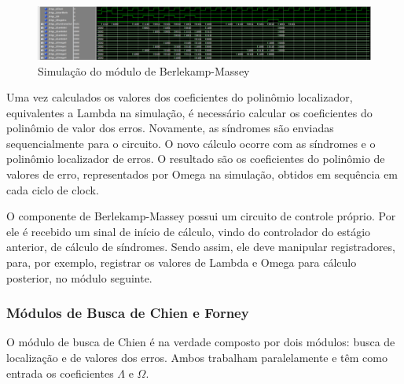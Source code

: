 	\begin{figure}[!htb]
		\caption{\label{fig_berlekamp_sim} Simulação do módulo de Berlekamp-Massey}
		\centering
		\includegraphics[width=1\textwidth]{RS/Sim_berlekamp.PNG}
		\legend{}
	\end{figure}
	
	Uma vez calculados os valores dos coeficientes do polinômio localizador, equivalentes a Lambda na simulação, é necessário calcular os coeficientes do polinômio de valor dos erros. Novamente, as síndromes são enviadas sequencialmente para o circuito. O novo cálculo ocorre com as síndromes e o polinômio localizador de erros. O resultado são os coeficientes do polinômio de valores de erro, representados por Omega na simulação, obtidos em sequência em cada ciclo de clock. 
	
	O componente de Berlekamp-Massey possui um circuito de controle próprio. Por ele é recebido um sinal de início de cálculo, vindo do controlador do estágio anterior, de cálculo de síndromes. Sendo assim, ele deve manipular registradores, para, por exemplo, registrar os valores de Lambda e Omega para cálculo posterior, no módulo seguinte.
	
	\subsubsection{Módulos de Busca de Chien e Forney}
	
	O módulo de busca de Chien é na verdade composto por dois módulos: busca de localização e de valores dos erros. Ambos trabalham paralelamente e têm como entrada os coeficientes $\Lambda$ e $\Omega$. 
	
